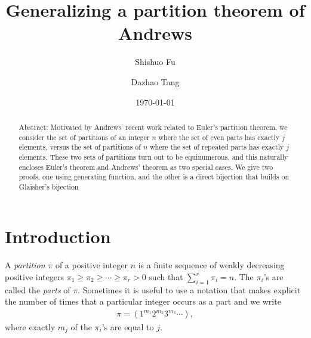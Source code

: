 \documentclass[12pt]{amsart}
\numberwithin{equation}{section}
\theoremstyle{plain}
\theoremstyle{definition}
\begin{document}
\title[Generalizing a partition theorem of Andrews]{Generalizing a partition theorem of Andrews}


\author[S. Fu]{Shishuo Fu}
\address[Shishuo Fu]{College of Mathematics and Statistics, Chongqing University, Huxi Campus LD506, Chongqing 401331, P.R. China}


\author[D. Tang]{Dazhao Tang}

\address[Dazhao Tang]{College of Mathematics and Statistics, Chongqing University, Huxi Campus LD206, Chongqing 401331, P.R. China}

\date{\today}


\begin{abstract}
Abstract: Motivated by Andrews' recent work related to Euler's partition theorem, we consider the set of partitions of an integer $n$ where the set of even parts has exactly $j$ elements, versus the set of partitions of $n$ where the set of repeated parts has exactly $j$ elements. These two sets of partitions turn out to be equinumerous, and this naturally encloses Euler's theorem and Andrews' theorem as two special cases. We give two proofs, one using generating function, and the other is a direct bijection that builds on Glaisher's bijection
\end{abstract}




\maketitle
\section{Introduction}
A \emph{partition} \cite{Andr1} $\pi$ of a positive integer $n$ is a finite sequence of weakly decreasing positive integers $\pi_{1}\geq\pi_{2}\geq\cdots\geq\pi_{r}>0$ such that $\sum_{i=1}^{r}\pi_{i}=n$. The $\pi_{i}$'s are called the \emph{parts} of $\pi$. Sometimes it is useful to use a notation that makes explicit the number of times that a particular integer occurs as a part and we write
\begin{align*}
\pi=(1^{m_{1}}2^{m_{2}}3^{m_{3}}\cdots),
\end{align*}
where exactly $m_{j}$ of the $\pi_{i}$'s are equal to $j$.
\end{document}
